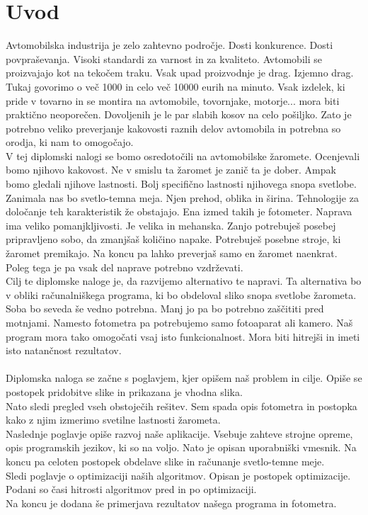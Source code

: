 \documentclass[oneside, a4paper, 12pt]{book}
\begin{document}
\chapter{Uvod}
Avtomobilska industrija je zelo zahtevno področje. Dosti konkurence. Dosti povpraševanja. Visoki standardi za varnost in za kvaliteto. Avtomobili se proizvajajo kot na tekočem traku. Vsak upad proizvodnje je drag. Izjemno drag. Tukaj govorimo o več 1000 in celo več 10000 eurih na minuto. Vsak izdelek, ki pride v tovarno in se montira na avtomobile, tovornjake, motorje... mora biti praktično neoporečen. Dovoljenih je le par slabih kosov na celo pošiljko. Zato je potrebno veliko preverjanje kakovosti raznih delov avtomobila in potrebna so orodja, ki nam to omogočajo.\\
V tej diplomski nalogi se bomo osredotočili na avtomobilske žaromete. Ocenjevali bomo njihovo kakovost. Ne v smislu ta žaromet je zanič ta je dober. Ampak bomo gledali njihove lastnosti. Bolj specifično lastnosti njihovega snopa svetlobe. \\
Zanimala nas bo svetlo-temna meja. Njen prehod, oblika in širina. Tehnologije za določanje teh karakteristik že obstajajo. Ena izmed takih je fotometer. Naprava ima veliko pomanjkljivosti. Je velika in mehanska. Zanjo potrebuješ posebej pripravljeno sobo, da zmanjšaš količino napake. Potrebuješ posebne stroje, ki žaromet premikajo. Na koncu pa lahko preverjaš samo en žaromet naenkrat. Poleg tega je pa vsak del naprave potrebno vzdrževati.\\
Cilj te diplomske naloge je, da razvijemo alternativo te napravi. Ta alternativa bo v obliki računalniškega programa, ki bo obdeloval sliko snopa svetlobe žarometa. Soba bo seveda še vedno potrebna. Manj jo pa bo potrebno zaščititi pred motnjami. Namesto fotometra pa potrebujemo samo fotoaparat ali kamero. Naš program mora tako omogočati vsaj isto funkcionalnost. Mora biti hitrejši in imeti isto natančnost rezultatov.\\
\\
Diplomska naloga se začne s poglavjem, kjer opišem naš problem in cilje. Opiše se postopek pridobitve slike in prikazana je vhodna slika.\\
Nato sledi pregled vseh obstoječih rešitev. Sem spada opis fotometra in postopka kako z njim izmerimo svetilne lastnosti žarometa.\\
Naslednje poglavje opiše razvoj naše aplikacije. Vsebuje zahteve strojne opreme, opis programskih jezikov, ki so na voljo. Nato je opisan uporabniški vmesnik. Na koncu pa celoten postopek obdelave slike in računanje svetlo-temne meje.\\
Sledi poglavje o optimizaciji naših algoritmov. Opisan je postopek optimizacije. Podani so časi hitrosti algoritmov pred in po optimizaciji.\\
Na koncu je dodana še primerjava rezultatov našega programa in fotometra.
\end{document}
